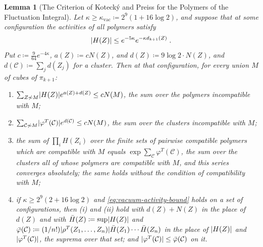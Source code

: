 \documentclass[11pt]{preprint}
\DeclarePairedDelimiter{\abs}{\lvert}{\rvert}
\numberwithin{equation}{section}
\newtheorem{lemma}{Lemma}[section]
\theoremstyle{definition}
\theoremstyle{remark}
\theoremstyle{plain}
\begin{document}
\begin{lemma}[The Criterion of Koteck\'y and Preiss for the Polymers of the Fluctuation Integral]\label{lem:vacuum-kp}
Let $\kappa \geq \kappa_{\mathrm{vac}} \coloneqq 2^9(1 + 16\log 2)$, and suppose that at some configuration the activities of all polymers satisfy
\begin{equation}\label{eq:vacuum-activity-bound}
    \abs{H(Z)} \leq e^{-5\kappa}e^{-\kappa d_{k+1}(Z)}\;.
\end{equation}
Put $c \coloneqq \frac{9}{64}e^{-4\kappa}$, $a(Z) \coloneqq cN(Z)$, and $d(Z) \coloneqq 9\log 2 \cdot N(Z)$, and $d(\mathcal C) \coloneqq \sum_jd(Z_j)$ for a cluster. Then at that configuration, for every union $M$ of cubes of $\pi_{k+1}$:
\begin{enumerate}[label=(\roman*)]
\item $\sum_{Z \not\sim M}\abs{H(Z)}e^{a(Z) + d(Z)} \leq cN(M)$, the sum over the polymers incompatible with $M$;
\item $\sum_{\mathcal C \not\sim M}\abs{\varphi^T(\mathcal C)}e^{d(\mathcal C)} \leq cN(M)$, the sum over the clusters incompatible with $M$;
\item the sum of $\prod_iH(Z_i)$ over the finite sets of pairwise compatible polymers which are compatible with $M$ equals $\exp\sum_{\mathcal C}\varphi^T(\mathcal C)$, the sum over the clusters all of whose polymers are compatible with $M$, and this series converges absolutely; the same holds without the condition of compatibility with $M$;
\item if $\kappa \geq 2^9(2 + 16\log 2)$ and \eqref{eq:vacuum-activity-bound} holds on a set of configurations, then (i) and (ii) hold with $d(Z) + N(Z)$ in the place of $d(Z)$ and with $\bar H(Z) \coloneqq \sup\abs{H(Z)}$ and $\bar\varphi(\mathcal C) \coloneqq (1/n!)\abs{\rho^T(Z_1, \dots, Z_n)}\bar H(Z_1) \cdots \bar H(Z_n)$ in the place of $\abs{H(Z)}$ and $\abs{\varphi^T(\mathcal C)}$, the suprema over that set; and $\abs{\varphi^T(\mathcal C)} \leq \bar\varphi(\mathcal C)$ on it.
\end{enumerate}
\end{lemma}
\end{document}
